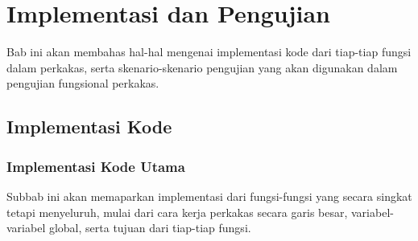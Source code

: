 \chapter{Implementasi dan Pengujian}
\label{chap:testing}

Bab ini akan membahas hal-hal mengenai implementasi kode dari tiap-tiap fungsi dalam perkakas, serta skenario-skenario pengujian yang akan digunakan dalam pengujian fungsional perkakas.

\section{Implementasi Kode}
\label{sec:testing-implementation}

\subsection{Implementasi Kode Utama}
\label{sec:testing-implementation-main}

Subbab ini akan memaparkan implementasi dari fungsi-fungsi yang secara singkat tetapi menyeluruh, mulai dari cara kerja perkakas secara garis besar, variabel-variabel global, serta tujuan dari tiap-tiap fungsi.
	
